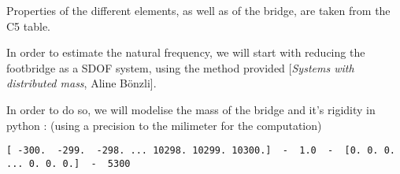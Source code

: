 Properties of the different elements, as well as of the bridge, are
taken from the C5 table.

In order to estimate the natural frequency, we will start with reducing
the footbridge as a SDOF system, using the method provided
{[}\emph{Systems with distributed mass}, Aline Bönzli{]}.

In order to do so, we will modelise the mass of the bridge and it's
rigidity in python : (using a precision to the milimeter for the
computation)

\begin{Shaded}
\begin{Highlighting}[]
\OperatorTok{=}  
\OperatorTok{=}  

\OperatorTok{=}  \OperatorTok{*}\OperatorTok{*}\NormalTok{ (}\NormalTok{) }
\end{Highlighting}
\end{Shaded}

\begin{Shaded}
\begin{Highlighting}[]
\OperatorTok{=}\OperatorTok{{-}}\NormalTok{, }\NormalTok{, }\NormalTok{)}
\OperatorTok{=}\NormalTok{ x[}\NormalTok{]}\OperatorTok{{-}}\NormalTok{x[}\NormalTok{] }
\OperatorTok{=} \OperatorTok{{-}}

\OperatorTok{=}

\OperatorTok{=}\NormalTok{)}
\end{Highlighting}
\end{Shaded}

\begin{verbatim}
[ -300.  -299.  -298. ... 10298. 10299. 10300.]  -  1.0  -  [0. 0. 0. ... 0. 0. 0.]  -  5300
\end{verbatim}

